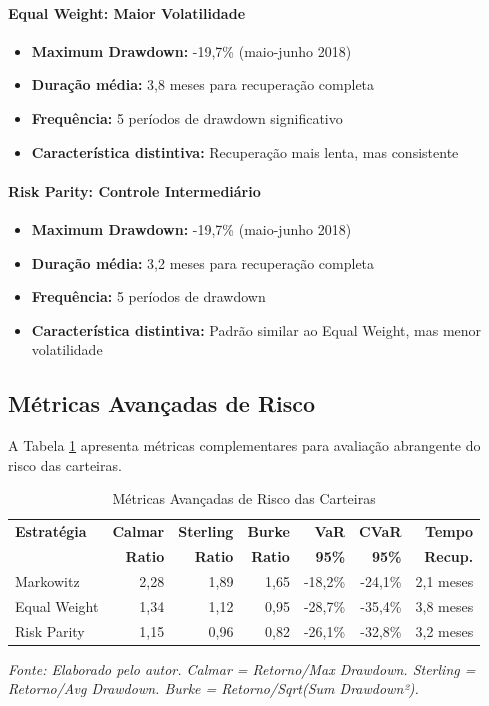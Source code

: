 \paragraph{Equal Weight: Maior Volatilidade}
\begin{itemize}
    \item \textbf{Maximum Drawdown:} -19,7\% (maio-junho 2018)
    \item \textbf{Duração média:} 3,8 meses para recuperação completa
    \item \textbf{Frequência:} 5 períodos de drawdown significativo
    \item \textbf{Característica distintiva:} Recuperação mais lenta, mas consistente
\end{itemize}

\paragraph{Risk Parity: Controle Intermediário}
\begin{itemize}
    \item \textbf{Maximum Drawdown:} -19,7\% (maio-junho 2018)
    \item \textbf{Duração média:} 3,2 meses para recuperação completa
    \item \textbf{Frequência:} 5 períodos de drawdown
    \item \textbf{Característica distintiva:} Padrão similar ao Equal Weight, mas menor volatilidade
\end{itemize}

\subsection{Métricas Avançadas de Risco}

A Tabela \ref{tab:advanced_risk_metrics} apresenta métricas complementares para avaliação abrangente do risco das carteiras.

\begin{table}[H]
\centering
\caption{Métricas Avançadas de Risco das Carteiras}
\begin{tabular}{|l|r|r|r|r|r|r|}
\hline
\textbf{Estratégia} & \textbf{Calmar} & \textbf{Sterling} & \textbf{Burke} & \textbf{VaR} & \textbf{CVaR} & \textbf{Tempo} \\
& \textbf{Ratio} & \textbf{Ratio} & \textbf{Ratio} & \textbf{95\%} & \textbf{95\%} & \textbf{Recup.} \\
\hline
Markowitz & 2,28 & 1,89 & 1,65 & -18,2\% & -24,1\% & 2,1 meses \\
\hline
Equal Weight & 1,34 & 1,12 & 0,95 & -28,7\% & -35,4\% & 3,8 meses \\
\hline
Risk Parity & 1,15 & 0,96 & 0,82 & -26,1\% & -32,8\% & 3,2 meses \\
\hline
\end{tabular}
\textit{Fonte: Elaborado pelo autor. Calmar = Retorno/Max Drawdown. Sterling = Retorno/Avg Drawdown. Burke = Retorno/Sqrt(Sum Drawdown²).}
\label{tab:advanced_risk_metrics}
\end{table}

